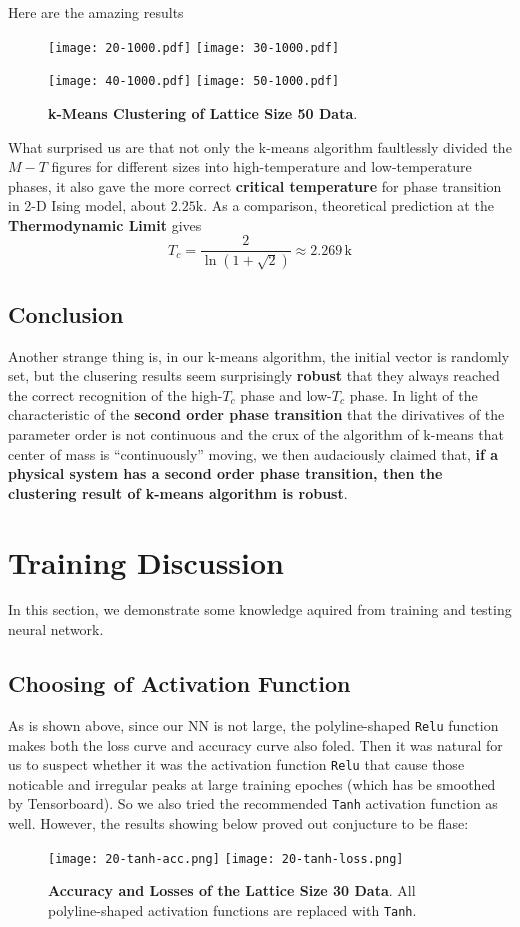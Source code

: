 \documentclass[prl,aps,twocolumn]{revtex4}
\begin{document}
	Here are the amazing results\par
	\begin{figure}[!htp]
		\texttt{[image: 20-1000.pdf]}
		\texttt{[image: 30-1000.pdf]}
	\end{figure}
	\begin{figure}[!htp]
		\texttt{[image: 40-1000.pdf]}
		\texttt{[image: 50-1000.pdf]}
		\caption{{\bf k-Means Clustering of Lattice Size 50 Data}.}
	\end{figure}
	What surprised us are that not only the k-means algorithm faultlessly divided the $M-T$ figures for different sizes into high-temperature and low-temperature phases, it also gave the more correct \textbf{critical temperature} for phase transition in 2-D Ising model, about $2.25 \mathrm{k}$. As a comparison, theoretical prediction at the \textbf{Thermodynamic Limit} gives
	\begin{equation}
		T_c=\dfrac{2}{\ln(1+\sqrt2)}\approx2.269\,\mathrm{k}
	\end{equation}
	\subsection{Conclusion}
		Another strange thing is, in our k-means algorithm, the initial vector is randomly set, but the clusering results seem surprisingly \textbf{robust} that they always reached the correct recognition of the high-$T_c$ phase and low-$T_c$ phase. In light of the characteristic of the \textbf{second order phase transition} that the dirivatives of the parameter order is not continuous and the crux of the algorithm of k-means that center of mass is ``continuously'' moving, we then audaciously claimed that, \textbf{if a physical system has a second order phase transition, then the clustering result of k-means algorithm is robust}.
	
\section{Training Discussion}
	In this section, we demonstrate some knowledge aquired from training and testing neural network.
	\subsection{Choosing of Activation Function}
		As is shown above, since our NN is not large, the polyline-shaped \texttt{Relu} function makes both the loss curve and accuracy curve also foled. Then it was natural for us to suspect whether it was the activation function \texttt{Relu} that cause those noticable and irregular peaks at large training epoches (which has be smoothed by Tensorboard). So we also tried the recommended \texttt{Tanh} activation function as well. However, the results showing below proved out conjucture to be flase: 
	\begin{figure}[!htp]
		\texttt{[image: 20-tanh-acc.png]}
		\texttt{[image: 20-tanh-loss.png]}
		\caption{{\bf Accuracy and Losses of the Lattice Size 30 Data}. All polyline-shaped activation functions are replaced with \texttt{Tanh}.}
	\end{figure}
\end{document}
